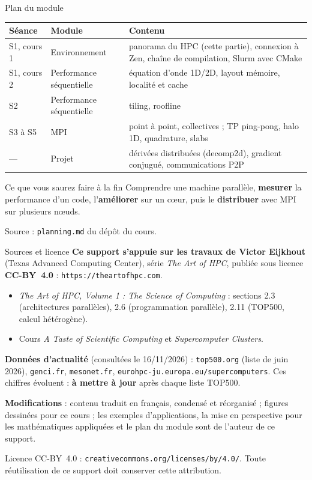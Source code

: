 \documentclass[8pt,aspectratio=169]{beamer}
\newcommand{\src}[1]{\vfill{\tiny\color{gray}Source : #1\par}}
\begin{document}
\begin{frame}{Plan du module}
\centering
\small
\begin{tabular}{@{}L{1.9cm}L{3.6cm}L{6.8cm}@{}}
\toprule
\textbf{Séance} & \textbf{Module} & \textbf{Contenu}\\
\midrule
S1, cours 1 & Environnement & panorama du HPC (cette partie), connexion à Zen, chaîne de compilation, Slurm avec CMake\\
S1, cours 2 & Performance séquentielle & équation d'onde 1D/2D, layout mémoire, localité et cache\\
S2 & Performance séquentielle & tiling, roofline\\
S3 à S5 & MPI & point à point, collectives ; TP ping-pong, halo 1D, quadrature, slabs\\
--- & Projet & dérivées distribuées (decomp2d), gradient conjugué, communications P2P\\
\bottomrule
\end{tabular}

\bigskip
\begin{block}{Ce que vous saurez faire à la fin}
Comprendre une machine parallèle, \textbf{mesurer} la performance d'un code, l'\textbf{améliorer} sur un cœur, puis le \textbf{distribuer} avec MPI sur plusieurs nœuds.
\end{block}
\src{\texttt{planning.md} du dépôt du cours.}
\end{frame}

\begin{frame}{Sources et licence}
\textbf{Ce support s'appuie sur les travaux de Victor Eijkhout} (Texas Advanced Computing Center), série \emph{The Art of HPC}, publiée sous licence \textbf{CC-BY~4.0} : \texttt{https://theartofhpc.com}.

\medskip
\begin{itemize}
\item \emph{The Art of HPC, Volume 1 : The Science of Computing} : sections 2.3 (architectures parallèles), 2.6 (programmation parallèle), 2.11 (TOP500, calcul hétérogène).
\item Cours \emph{A Taste of Scientific Computing} et \emph{Supercomputer Clusters}.
\end{itemize}

\medskip
\textbf{Données d'actualité} (consultées le 16/11/2026) : \texttt{top500.org} (liste de juin 2026), \texttt{genci.fr}, \texttt{mesonet.fr}, \texttt{eurohpc-ju.europa.eu/supercomputers}. Ces chiffres évoluent : \textbf{à mettre à jour} après chaque liste TOP500.

\medskip
\textbf{Modifications} : contenu traduit en français, condensé et réorganisé ; figures dessinées pour ce cours ; les exemples d'applications, la mise en perspective pour les mathématiques appliquées et le plan du module sont de l'auteur de ce support.

\bigskip
{\scriptsize Licence CC-BY~4.0 : \texttt{creativecommons.org/licenses/by/4.0/}. Toute réutilisation de ce support doit conserver cette attribution.}
\end{frame}
\end{document}
